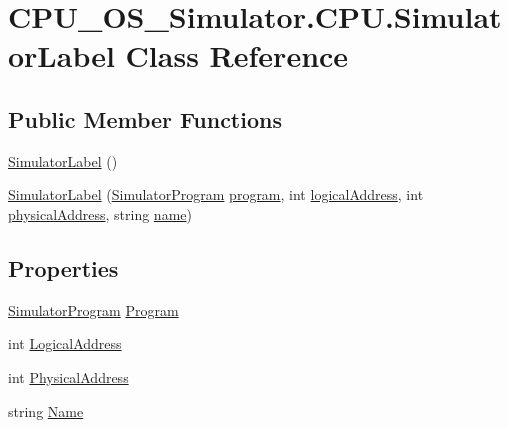 \hypertarget{class_c_p_u___o_s___simulator_1_1_c_p_u_1_1_simulator_label}{}\section{C\+P\+U\+\_\+\+O\+S\+\_\+\+Simulator.\+C\+P\+U.\+Simulator\+Label Class Reference}
\label{class_c_p_u___o_s___simulator_1_1_c_p_u_1_1_simulator_label}
\subsection*{Public Member Functions}
\begin{DoxyCompactItemize}
\item 
\hyperlink{class_c_p_u___o_s___simulator_1_1_c_p_u_1_1_simulator_label_a09244ac74d56223bf5b3ce221f3c96e2}{Simulator\+Label} ()
\item 
\hyperlink{class_c_p_u___o_s___simulator_1_1_c_p_u_1_1_simulator_label_ac3d8de444fe7deecd39e6f606abd6313}{Simulator\+Label} (\hyperlink{class_c_p_u___o_s___simulator_1_1_c_p_u_1_1_simulator_program}{Simulator\+Program} \hyperlink{class_c_p_u___o_s___simulator_1_1_c_p_u_1_1_simulator_label_a36f257dae0ef3fbe2f065d512bb77ea6}{program}, int \hyperlink{class_c_p_u___o_s___simulator_1_1_c_p_u_1_1_simulator_label_a162a4db93b4ba86bbc6a24d941e8d562}{logical\+Address}, int \hyperlink{class_c_p_u___o_s___simulator_1_1_c_p_u_1_1_simulator_label_a7ce6ad5f310ea43b6bedb50dcc88feac}{physical\+Address}, string \hyperlink{class_c_p_u___o_s___simulator_1_1_c_p_u_1_1_simulator_label_a838775e03814814059fc93592131392a}{name})
\end{DoxyCompactItemize}
\subsection*{Properties}
\begin{DoxyCompactItemize}
\item 
\hyperlink{class_c_p_u___o_s___simulator_1_1_c_p_u_1_1_simulator_program}{Simulator\+Program} \hyperlink{class_c_p_u___o_s___simulator_1_1_c_p_u_1_1_simulator_label_ab30b536a4ea675050256886bd467d03a}{Program}
\item 
int \hyperlink{class_c_p_u___o_s___simulator_1_1_c_p_u_1_1_simulator_label_a24d8cf4f09a3b9cb84f279d300a87e73}{Logical\+Address}
\item 
int \hyperlink{class_c_p_u___o_s___simulator_1_1_c_p_u_1_1_simulator_label_a79e1920d572ce2003d032ba36bbc4e3a}{Physical\+Address}
\item 
string \hyperlink{class_c_p_u___o_s___simulator_1_1_c_p_u_1_1_simulator_label_ad972ea456b90d8e8ec4e550e28f418a6}{Name}
\end{DoxyCompactItemize}
